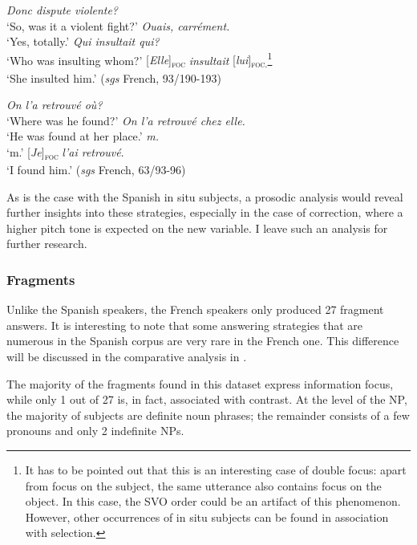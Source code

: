 { \ea \label{ex:3:20}
\ea \textit{Donc dispute violente?}\\
 ‘So, was it a violent fight?'
 \ex \textit{Ouais, carrément.}\\
 ‘Yes, totally.'
  \textit{Qui insultait qui?}\\
 ‘Who was insulting whom?'
 {[\textit{Elle}]\textsubscript{\textsc{foc}}} \normalsize \textit{insultait} {[\textit{lui}]\textsubscript{\textsc{foc.}}}\footnote{It has to be pointed out that this is an interesting case of double focus: apart from focus on the subject, the same utterance also contains focus on the object. In this case, the SVO order could be an artifact of this phenomenon. However, other occurrences of in situ subjects can be found in association with selection.}\\
‘She insulted him.' \hfill (\textit{sgs} French, 93/190-193)   
\z \z 

 \ea \label{ex:3:21}
\ea \textit{On l'a retrouvé où?}\\
 ‘Where was he found?'
 \ex \textit{On l'a retrouvé chez elle.}\\
 ‘He was found at her place.'
  \textit{m.}\\
 ‘m.'
 {[\textit{Je}]\textsubscript{\textsc{foc}}} \normalsize \textit{l'ai retrouvé}. \\
‘I found him.' \hfill (\textit{sgs} French, 63/93-96)    
\z \z 


As is the case with the Spanish in situ subjects, a prosodic analysis would reveal further insights into these strategies, especially in the case of correction, where a higher pitch tone is expected on the new variable. I leave such an analysis for further research.


\subsubsection{Fragments} \label{sub:4.6.1.4}

Unlike the Spanish speakers, the French speakers only produced 27 fragment answers. It is interesting to note that some answering strategies that are numerous in the Spanish corpus are very rare in the French one. This difference will be discussed in the comparative analysis in .

The majority of the fragments found in this dataset express information focus, while only 1 out of 27 is, in fact, associated with contrast. At the level of the NP, the majority of subjects are definite noun phrases; the remainder consists of a few pronouns and only 2 indefinite NPs.

}
